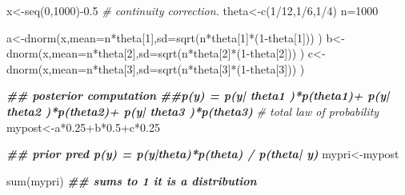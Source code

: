 \documentclass[
]{book}
\newenvironment{Shaded}{\begin{snugshade}}{\end{snugshade}}
\newcommand{\AttributeTok}[1]{\textcolor[rgb]{0.77,0.63,0.00}{#1}}
\newcommand{\CommentTok}[1]{\textcolor[rgb]{0.56,0.35,0.01}{\textit{#1}}}
\newcommand{\DecValTok}[1]{\textcolor[rgb]{0.00,0.00,0.81}{#1}}
\newcommand{\DocumentationTok}[1]{\textcolor[rgb]{0.56,0.35,0.01}{\textbf{\textit{#1}}}}
\newcommand{\FloatTok}[1]{\textcolor[rgb]{0.00,0.00,0.81}{#1}}
\newcommand{\FunctionTok}[1]{\textcolor[rgb]{0.00,0.00,0.00}{#1}}
\newcommand{\NormalTok}[1]{#1}
\newcommand{\OtherTok}[1]{\textcolor[rgb]{0.56,0.35,0.01}{#1}}
\newcommand{\SpecialCharTok}[1]{\textcolor[rgb]{0.00,0.00,0.00}{#1}}
\theoremstyle{definition}
\theoremstyle{definition}
\theoremstyle{definition}
\theoremstyle{definition}
\theoremstyle{remark}
\begin{document}
\begin{Shaded}
\begin{Highlighting}[]
\NormalTok{x}\OtherTok{\textless{}{-}}\FunctionTok{seq}\NormalTok{(}\DecValTok{0}\NormalTok{,}\DecValTok{1000}\NormalTok{)}\SpecialCharTok{{-}}\FloatTok{0.5} \CommentTok{\# continuity correction.}
\NormalTok{theta}\OtherTok{\textless{}{-}}\FunctionTok{c}\NormalTok{(}\DecValTok{1}\SpecialCharTok{/}\DecValTok{12}\NormalTok{,}\DecValTok{1}\SpecialCharTok{/}\DecValTok{6}\NormalTok{,}\DecValTok{1}\SpecialCharTok{/}\DecValTok{4}\NormalTok{)}
\NormalTok{n}\OtherTok{=}\DecValTok{1000}

\NormalTok{a}\OtherTok{\textless{}{-}}\FunctionTok{dnorm}\NormalTok{(x,}\AttributeTok{mean=}\NormalTok{n}\SpecialCharTok{*}\NormalTok{theta[}\DecValTok{1}\NormalTok{],}\AttributeTok{sd=}\FunctionTok{sqrt}\NormalTok{(n}\SpecialCharTok{*}\NormalTok{theta[}\DecValTok{1}\NormalTok{]}\SpecialCharTok{*}\NormalTok{(}\DecValTok{1}\SpecialCharTok{{-}}\NormalTok{theta[}\DecValTok{1}\NormalTok{]))  )}
\NormalTok{b}\OtherTok{\textless{}{-}}\FunctionTok{dnorm}\NormalTok{(x,}\AttributeTok{mean=}\NormalTok{n}\SpecialCharTok{*}\NormalTok{theta[}\DecValTok{2}\NormalTok{],}\AttributeTok{sd=}\FunctionTok{sqrt}\NormalTok{(n}\SpecialCharTok{*}\NormalTok{theta[}\DecValTok{2}\NormalTok{]}\SpecialCharTok{*}\NormalTok{(}\DecValTok{1}\SpecialCharTok{{-}}\NormalTok{theta[}\DecValTok{2}\NormalTok{]))  )}
\NormalTok{c}\OtherTok{\textless{}{-}}\FunctionTok{dnorm}\NormalTok{(x,}\AttributeTok{mean=}\NormalTok{n}\SpecialCharTok{*}\NormalTok{theta[}\DecValTok{3}\NormalTok{],}\AttributeTok{sd=}\FunctionTok{sqrt}\NormalTok{(n}\SpecialCharTok{*}\NormalTok{theta[}\DecValTok{3}\NormalTok{]}\SpecialCharTok{*}\NormalTok{(}\DecValTok{1}\SpecialCharTok{{-}}\NormalTok{theta[}\DecValTok{3}\NormalTok{]))  )}

 \DocumentationTok{\#\# posterior computation}
 \DocumentationTok{\#\#p(y) =  p(y| theta1 )*p(theta1)+ p(y| theta2 )*p(theta2)+ p(y| theta3 )*p(theta3)}
 \CommentTok{\# total law of probability}
\NormalTok{mypost}\OtherTok{\textless{}{-}}\NormalTok{a}\SpecialCharTok{*}\FloatTok{0.25}\SpecialCharTok{+}\NormalTok{b}\SpecialCharTok{*}\FloatTok{0.5}\SpecialCharTok{+}\NormalTok{c}\SpecialCharTok{*}\FloatTok{0.25}

\DocumentationTok{\#\# prior pred  p(y) = p(y|theta)*p(theta) / p(theta| y)}
\NormalTok{mypri}\OtherTok{\textless{}{-}}\NormalTok{mypost}

\FunctionTok{sum}\NormalTok{(mypri) }\DocumentationTok{\#\# sums to 1 it is a distribution}
\end{Highlighting}
\end{Shaded}
\end{document}
